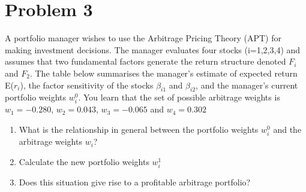 \documentclass[12]{article}
\begin{document}
\color{black}
\section*{Problem 3}
A portfolio manager wishes to use the Arbitrage Pricing Theory (APT) for making investment decisions. The manager evaluates four stocks (i=1,2,3,4) and assumes that two fundamental factors generate the return structure denoted $F_i$ and $F_2$. The table below summarises the manager's estimate of expected return E($r_i$), the factor sensitivity of the stocks $\beta_{i1}$ and $\beta_{i2}$, and the manager's current portfolio weights $w_i^0$.
You learn that the set of possible arbitrage weights is $w_1 = -0.280$, $w_2 = 0.043$, $w_3 = -0.065$ and $w_4 = 0.302$

\begin{table}[H]
\centering
{}
\label{tab:my-table}
\end{table}
\begin{enumerate}
    \item[a)] What is the relationship in general between the portfolio weights $w_i^0$ and the arbitrage weights $w_i$?
    \item[b)] Calculate the new portfolio weights $w_i^1$
    \item[c)] Does this situation give rise to a profitable arbitrage portfolio?
\end{enumerate}

\noindent

\noindent
\end{document}
